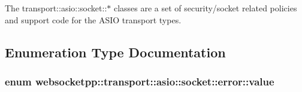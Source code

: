 The transport\+::asio\+::socket\+:\+:$\ast$ classes are a set of security/socket related policies and support code for the A\+S\+IO transport types. 

\subsection{Enumeration Type Documentation}
\subsubsection[{\texorpdfstring{value}{value}}]{\setlength{\rightskip}{0pt plus 5cm}enum {\bf websocketpp\+::transport\+::asio\+::socket\+::error\+::value}}\hypertarget{namespacewebsocketpp_1_1transport_1_1asio_1_1socket_1_1error_a828ddaa5ed63a761e1b557465a35f05a}{}\label{namespacewebsocketpp_1_1transport_1_1asio_1_1socket_1_1error_a828ddaa5ed63a761e1b557465a35f05a}

